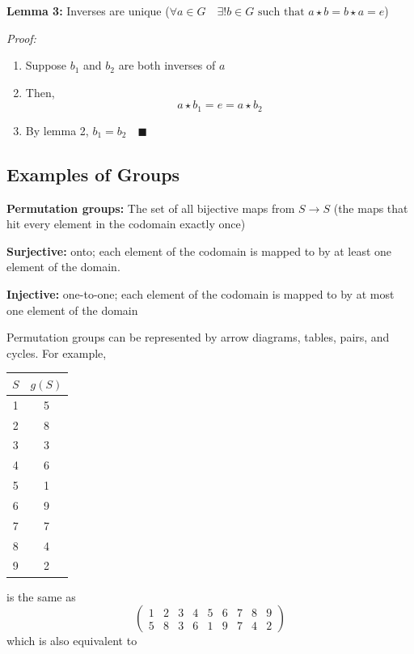 \documentclass[12pt]{report}
\newcommand{\qed}{\quad \blacksquare}
\begin{document}
\textbf{Lemma 3:} Inverses are unique ($\forall a \in G \quad \exists ! b \in G \text{ such that } a \star b = b \star a = e$)

\emph{Proof:}
\begin{enumerate}
    \item Suppose $b_1$ and $b_2$ are both inverses of $a$
    \item Then, 
    \[a \star b_1 = e = a \star b_2\]
    \item By lemma 2, $b_1 = b_2 \qed$
\end{enumerate}

\subsection*{Examples of Groups}
\textbf{Permutation groups:} The set of all bijective maps from $S \to S$ (the maps that hit every element in the codomain exactly once)

\textbf{Surjective:} onto; each element of the codomain is mapped to by at least one element of the domain.

\textbf{Injective:} one-to-one; each element of the codomain is mapped to by at most one element of the domain
  
Permutation groups can be represented by arrow diagrams, tables, pairs, and cycles. For example, 
\begin{center}
    \begin{tabular*}{0.78 in}{|c|c|}
        \hline
        $S$ & $g(S)$\\
        \hline
        1 & 5\\
        2 & 8\\
        3 & 3\\
        4 & 6\\
        5 & 1\\
        6 & 9\\
        7 & 7\\
        8 & 4\\
        9 & 2\\
        \hline
    \end{tabular*}
\end{center}

is the same as 
\[\begin{pmatrix}
    1 & 2 & 3 & 4 & 5 & 6 & 7 & 8 & 9\\
    5 & 8 & 3 & 6 & 1 & 9 & 7 & 4 & 2
\end{pmatrix}\]
which is also equivalent to 
\end{document}
